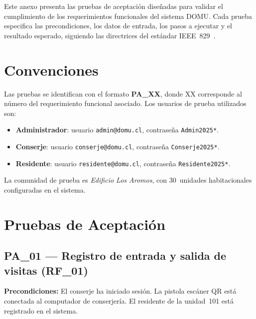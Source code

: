 
Este anexo presenta las pruebas de aceptación diseñadas para validar el cumplimiento de los requerimientos funcionales del sistema DOMU. Cada prueba especifica las precondiciones, los datos de entrada, los pasos a ejecutar y el resultado esperado, siguiendo las directrices del estándar IEEE~829~\cite{IEEE829-2008}.

\section{Convenciones}

Las pruebas se identifican con el formato \textbf{PA\_XX}, donde XX corresponde al número del requerimiento funcional asociado. Los usuarios de prueba utilizados son:

\begin{itemize}
    \item \textbf{Administrador}: usuario \texttt{admin@domu.cl}, contraseña \texttt{Admin2025*}.
    \item \textbf{Conserje}: usuario \texttt{conserje@domu.cl}, contraseña \texttt{Conserje2025*}.
    \item \textbf{Residente}: usuario \texttt{residente@domu.cl}, contraseña \texttt{Residente2025*}.
\end{itemize}

La comunidad de prueba es \textit{Edificio Los Aromos}, con 30~unidades habitacionales configuradas en el sistema.

\section{Pruebas de Aceptación}

\subsection{PA\_01 — Registro de entrada y salida de visitas (RF\_01)}

\textbf{Precondiciones:} El conserje ha iniciado sesión. La pistola escáner QR está conectada al computador de conserjería. El residente de la unidad~101 está registrado en el sistema.

